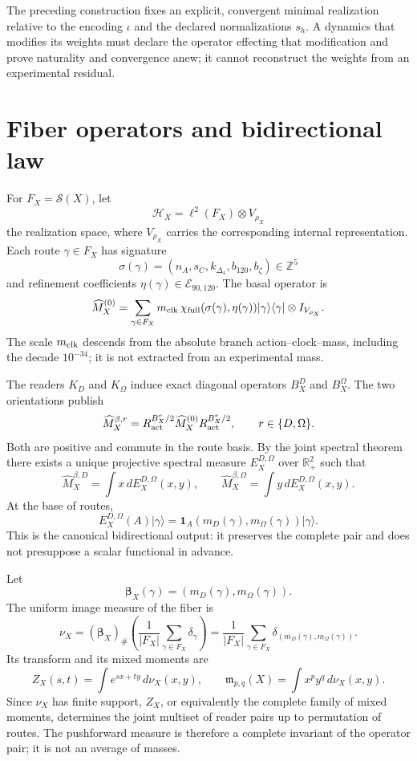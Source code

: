 The preceding construction fixes an explicit, convergent minimal realization relative to the encoding \(\iota\) and the declared normalizations \(s_h\). A dynamics that modifies its weights must declare the operator effecting that modification and prove naturality and convergence anew; it cannot reconstruct the weights from an experimental residual.

\section{Fiber operators and bidirectional law}

For \(F_X=\mathscr S(X)\), let
\[
 \mathcal H_X=\ell^2(F_X)\otimes V_{\rho_X}
\]
the realization space, where \(V_{\rho_X}\) carries the corresponding internal
representation. Each route \(\gamma\in F_X\) has signature
\[
 \sigma(\gamma)
 =(n_A,s_C,k_{\Delta_4},b_{120},b_\zeta)\in\mathbb Z^5
\]
and refinement coefficients
\(\eta(\gamma)\in\mathcal E_{90,120}\). The basal operator is
\[
 \widehat M_X^{(0)}
 =\sum_{\gamma\in F_X}
 m_{\rm clk}\,
 \chi_{\rm full}(\sigma(\gamma),\eta(\gamma))
 |\gamma\rangle\langle\gamma|\otimes I_{V_{\rho_X}}.
\]
The scale \(m_{\rm clk}\) descends from the absolute branch
action--clock--mass, including the decade \(10^{-34}\); it is not extracted from an
experimental mass.

The readers \(K_D\) and \(K_\Omega\) induce exact diagonal operators
\(B_X^D\) and \(B_X^\Omega\). The two orientations publish
\[
 \widehat M_X^{\beta,r}
 =R_{\rm act}^{B_X^r/2}\widehat M_X^{(0)}
  R_{\rm act}^{B_X^r/2},
 \qquad r\in\{D,\Omega\}.
\]
Both are positive and commute in the route basis. By the joint spectral theorem
there exists a unique projective spectral measure
\(E_X^{D,\Omega}\) over \(\mathbb R_+^2\) such that
\[
 \widehat M_X^{\beta,D}
 =\int x\,dE_X^{D,\Omega}(x,y),
 \qquad
 \widehat M_X^{\beta,\Omega}
 =\int y\,dE_X^{D,\Omega}(x,y).
\]
At the base of routes,
\[
 E_X^{D,\Omega}(A)|\gamma\rangle
 =\mathbf 1_A\!\left(m_D(\gamma),m_\Omega(\gamma)\right)
  |\gamma\rangle.
\]
This is the canonical bidirectional output: it preserves the complete pair and does not
presuppose a scalar functional in advance.

Let
\[
 \boldsymbol\beta_X(\gamma)
 =(m_D(\gamma),m_\Omega(\gamma)).
\]
The uniform image measure of the fiber is
\[
 \nu_X=(\boldsymbol\beta_X)_\#
 \left(\frac1{|F_X|}\sum_{\gamma\in F_X}\delta_\gamma\right)
 =\frac1{|F_X|}\sum_{\gamma\in F_X}
 \delta_{(m_D(\gamma),m_\Omega(\gamma))}.
\]
Its transform and its mixed moments are
\[
 Z_X(s,t)=\int e^{sx+ty}\,d\nu_X(x,y),
 \qquad
 \mathfrak m_{p,q}(X)=\int x^py^q\,d\nu_X(x,y).
\]
Since \(\nu_X\) has finite support, \(Z_X\), or equivalently the complete
family of mixed moments, determines the joint multiset of reader pairs
up to permutation of routes. The pushforward measure is therefore a
complete invariant of the operator pair; it is not an average of masses.

